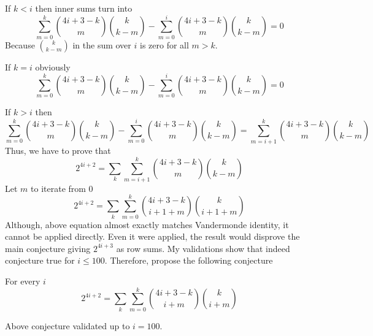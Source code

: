 If $k < i$ then inner sums turn into
\begin{equation*}
    \sum_{m=0}^{k} \binom{4i+3-k}{m} \binom{k}{k-m} - \sum_{m=0}^{i} \binom{4i+3-k}{m} \binom{k}{k-m}
    = 0
\end{equation*}
Because $\binom{k}{k-m}$ in the sum over $i$ is zero for all $m > k$.

If $k = i$ obviously
\begin{equation*}
    \sum_{m=0}^{k} \binom{4i+3-k}{m} \binom{k}{k-m} - \sum_{m=0}^{i} \binom{4i+3-k}{m} \binom{k}{k-m} = 0
\end{equation*}

If $k > i$ then
\begin{equation*}
    \sum_{m=0}^{k} \binom{4i+3-k}{m} \binom{k}{k-m} - \sum_{m=0}^{i} \binom{4i+3-k}{m} \binom{k}{k-m}
    = \sum_{m=i+1}^{k} \binom{4i+3-k}{m} \binom{k}{k-m}
\end{equation*}
Thus, we have to prove that
\begin{equation*}
    2^{4i+2} = \sum_{k} \sum_{m=i+1}^{k} \binom{4i+3-k}{m} \binom{k}{k-m}
\end{equation*}
Let $m$ to iterate from 0
\begin{equation*}
    2^{4i+2} = \sum_{k} \sum_{m=0}^{k} \binom{4i+3-k}{i+1+m} \binom{k}{i+1+m}
\end{equation*}
Although, above equation almost exactly matches Vandermonde identity, it cannot be applied directly.
Even it were applied, the result would disprove the main conjecture giving $2^{4i+3}$ as row sums.
My validations show that indeed conjecture true for $i \leq 100$.
Therefore, propose the following conjecture
\begin{conjecture} For every $i$
    \begin{equation*}
        2^{4i+2} = \sum_{k} \sum_{m=0}^{k} \binom{4i+3-k}{i+m} \binom{k}{i+m}
    \end{equation*}
\end{conjecture}
Above conjecture validated up to $i=100$.
